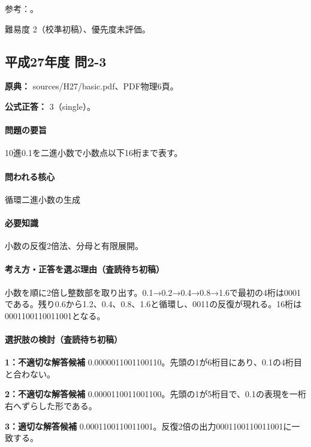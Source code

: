 \par 参考：\cite{goldberg1991}。

\par 難易度 2（校準初稿）、優先度未評価。

\subsection{平成27年度 問2-3}
\label{q:h27-reg-basic-2-3}

\noindent\textbf{原典：} sources/H27/basic.pdf、PDF物理6頁。

\textbf{公式正答：} 3（single）。

\paragraph{問題の要旨} 10進0.1を二進小数で小数点以下16桁まで表す。

\paragraph{問われる核心} 循環二進小数の生成

\paragraph{必要知識} 小数の反復2倍法、分母と有限展開。

\paragraph{考え方・正答を選ぶ理由（査読待ち初稿）} 小数を順に2倍し整数部を取り出す。0.1→0.2→0.4→0.8→1.6で最初の4桁は0001である。残り0.6から1.2、0.4、0.8、1.6と循環し、0011の反復が現れる。16桁は0001100110011001となる。

\paragraph{選択肢の検討（査読待ち初稿）}\mbox{}\par

\noindent\textbf{1：不適切な解答候補} 0.0000011001100110。先頭の1が6桁目にあり、0.1の4桁目と合わない。\par

\noindent\textbf{2：不適切な解答候補} 0.0000110011001100。先頭の1が5桁目で、0.1の表現を一桁右へずらした形である。\par

\noindent\textbf{3：適切な解答候補} 0.0001100110011001。反復2倍の出力0001100110011001に一致する。\par

